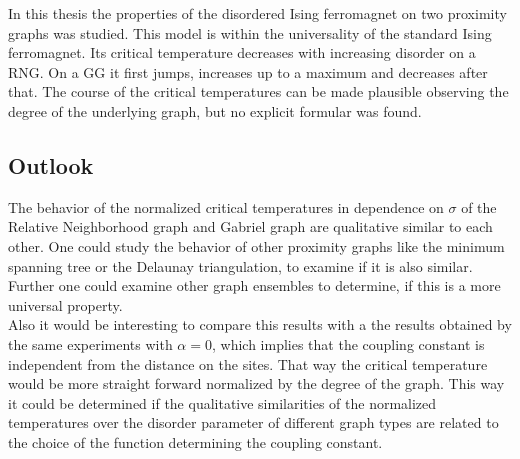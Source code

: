 In this thesis the properties of the disordered Ising ferromagnet on two
proximity graphs was studied. This model is within the universality of
the standard Ising ferromagnet. Its critical temperature decreases with
increasing disorder on a RNG. On a GG it first jumps, increases up to
a maximum and decreases after that. The course of the critical
temperatures can be made plausible observing the degree of the underlying
graph, but no explicit formular was found.

\subsection{Outlook}
    The behavior of the normalized critical temperatures in dependence
    on \(\sigma\) of the Relative Neighborhood graph and Gabriel graph
    are qualitative similar to each other. One could study the behavior
    of other proximity graphs like the minimum spanning tree or the
    Delaunay triangulation, to examine if it is also similar. Further
    one could examine other graph ensembles to determine, if this is a
    more universal property.\\
    Also it would be interesting to compare this results with a the
    results obtained by the same experiments with \(\alpha = 0\), which
    implies that the coupling constant is independent from the distance
    on the sites. That way the critical temperature would be more
    straight forward normalized by the degree of the graph. This way it
    could be determined if the qualitative similarities of the
    normalized temperatures over the disorder parameter of different
    graph types are related to the choice of the function determining the
    coupling constant.
